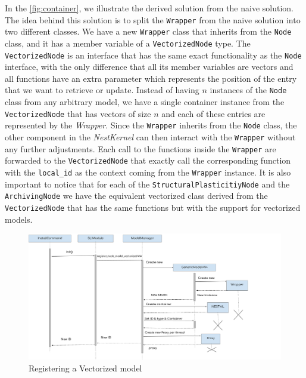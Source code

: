 In the \autoref{fig:container}, we illustrate the derived solution from the naive solution. The idea behind this solution is to split the \texttt{Wrapper} from the naive solution into two different classes. We have a new \texttt{Wrapper} class that inherits from the \texttt{Node} class, and it has a member variable of a \texttt{VectorizedNode} type. The \texttt{VectorizedNode}  is an interface that has the same exact functionality as the \texttt{Node} interface, with the only difference that all its member variables are vectors and all functions have an extra parameter which represents the position of the entry that we want to retrieve or update. Instead of having $n$ instances of the \texttt{Node} class from any arbitrary model, we have a single container instance from  the \texttt{VectorizedNode} that has vectors of size $n$ and each of these entries are represented by the \emph{Wrapper}. Since the \texttt{Wrapper} inherits from the \texttt{Node} class, the other component in the \emph{NestKernel} can then interact with the \texttt{Wrapper} without any further adjustments. Each call to the functions inside the \texttt{Wrapper} are forwarded to the \texttt{VectorizedNode} that exactly call the corresponding function with the \texttt{local\_id} as the context coming from the \texttt{Wrapper} instance. It is also important to notice that for each of the \texttt{StructuralPlasticitiyNode} and the \texttt{ArchivingNode} we have the equivalent vectorized class derived from the \texttt{VectorizedNode} that has the same functions but with the support for vectorized models.


\begin{figure}[h!]
\centering
\includegraphics[width=\textwidth]{src/pic/node_creation_vec.png}
\caption{Registering a Vectorized model}
\label{fig:register_container}
\end{figure}

